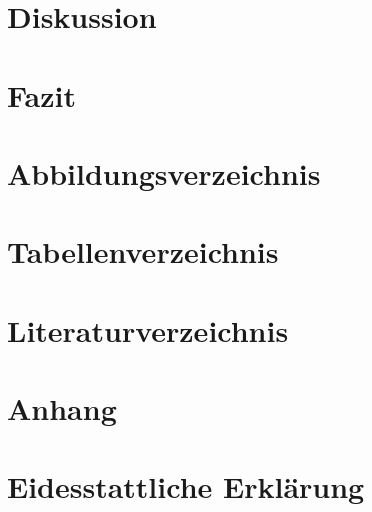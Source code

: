 \documentclass[a4paper]{article}
\begin{document}

\section{Diskussion}


\section{Fazit}


\newpage

\section{Abbildungsverzeichnis}


\section{Tabellenverzeichnis}


\section{Literaturverzeichnis}


\newpage

\section{Anhang}

\section{Eidesstattliche Erklärung}

\end{document}
